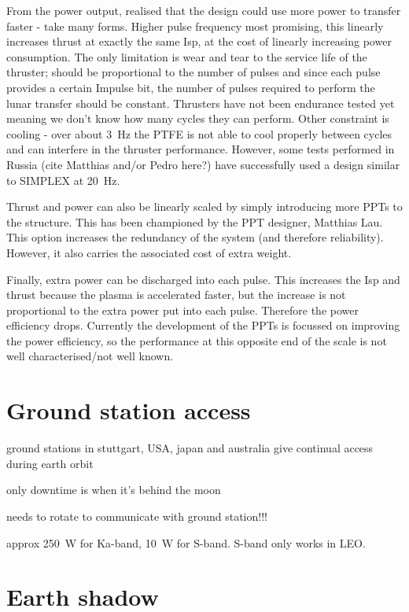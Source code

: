 From the power output, realised that the design could use more power to transfer faster - take many forms. Higher pulse frequency most promising, this linearly increases thrust at exactly the same Isp, at the cost of linearly increasing power consumption. The only limitation is wear and tear to the service life of the thruster; should be proportional to the number of pulses and since each pulse provides a certain Impulse bit, the number of pulses required to perform the lunar transfer should be constant. Thrusters have not been endurance tested yet meaning we don't know how many cycles they can perform. Other constraint is cooling - over about 3~Hz the PTFE is not able to cool properly between cycles and can interfere in the thruster performance. However, some tests performed in Russia (cite Matthias and/or Pedro here?) have successfully used a design similar to SIMPLEX at 20~Hz.

Thrust and power can also be linearly scaled by simply introducing more PPTs to the structure. This has been championed by the PPT designer, Matthias Lau. This option increases the redundancy of the system (and therefore reliability). However, it also carries the associated cost of extra weight.

Finally, extra power can be discharged into each pulse. This increases the Isp and thrust because the plasma is accelerated faster, but the increase is not proportional to the extra power put into each pulse. Therefore the power efficiency drops. Currently the development of the PPTs is focussed on improving the power efficiency, so the performance at this opposite end of the scale is not well characterised/not well known.

\section{Ground station access}
ground stations in stuttgart, USA, japan and australia give continual access during earth orbit

only downtime is when it's behind the moon

needs to rotate to communicate with ground station!!!

approx 250~W for Ka-band, 10~W for S-band. S-band only works in LEO.

\section{Earth shadow}

